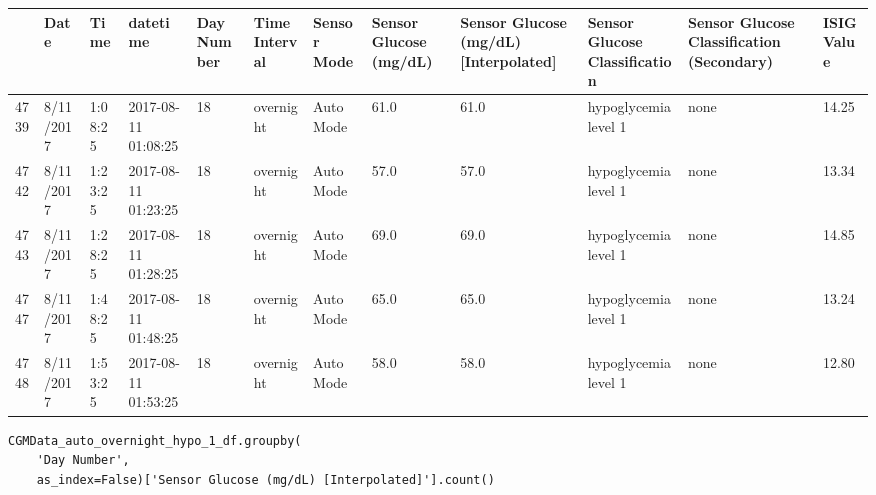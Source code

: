 \bigskip\noindent
\begin{tabular}{p{}p{}p{}p{}p{}p{}p{}p{}p{}p{}p{}p{}}
\toprule
 & Date & Time & datetime & Day Number & Time Interval & Sensor Mode & Sensor Glucose (mg/dL) & Sensor Glucose (mg/dL) [Interpolated] & Sensor Glucose Classification & Sensor Glucose Classification (Secondary) & ISIG Value \\
\hline
4739 & 8/11/2017 & 1:08:25 & 2017-08-11 01:08:25 & 18 & overnight & Auto Mode & 61.0 & 61.0 & hypoglycemia level 1 & none & 14.25 \\
\hline
4742 & 8/11/2017 & 1:23:25 & 2017-08-11 01:23:25 & 18 & overnight & Auto Mode & 57.0 & 57.0 & hypoglycemia level 1 & none & 13.34 \\
\hline
4743 & 8/11/2017 & 1:28:25 & 2017-08-11 01:28:25 & 18 & overnight & Auto Mode & 69.0 & 69.0 & hypoglycemia level 1 & none & 14.85 \\
\hline
4747 & 8/11/2017 & 1:48:25 & 2017-08-11 01:48:25 & 18 & overnight & Auto Mode & 65.0 & 65.0 & hypoglycemia level 1 & none & 13.24 \\
\hline
4748 & 8/11/2017 & 1:53:25 & 2017-08-11 01:53:25 & 18 & overnight & Auto Mode & 58.0 & 58.0 & hypoglycemia level 1 & none & 12.80 \\
\hline
\bottomrule
\end{tabular}

\bigskip

\begin{verbatim}
CGMData_auto_overnight_hypo_1_df.groupby(
    'Day Number', 
    as_index=False)['Sensor Glucose (mg/dL) [Interpolated]'].count()
\end{verbatim}

